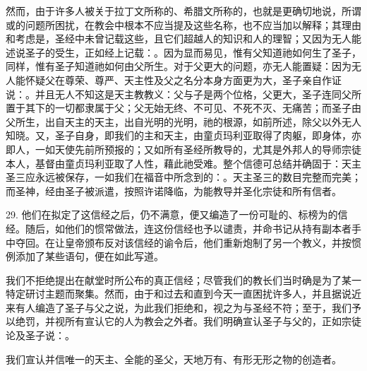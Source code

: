然而，由于许多人被关于拉丁文所称的、希腊文所称的，也就是更确切地说，所谓或的问题所困扰，在教会中根本不应当提及这些名称，也不应当加以解释；其理由和考虑是，圣经中未曾记载这些，且它们超越人的知识和人的理智；又因为无人能述说圣子的受生，正如经上记载：。因为显而易见，惟有父知道祂如何生了圣子，同样，惟有圣子知道祂如何由父所生。对于父更大的问题，亦无人能置疑：因为无人能怀疑父在尊荣、尊严、天主性及父之名分本身方面更为大，圣子亲自作证说：。并且无人不知这是天主教教义：父与子是两个位格，父更大，圣子连同父所置于其下的一切都隶属于父；父无始无终、不可见、不死不灭、无痛苦；而圣子由父所生，出自天主的天主，出自光明的光明，祂的根源，如前所述，除父以外无人知晓。又，圣子自身，即我们的主和天主，由童贞玛利亚取得了肉躯，即身体，亦即人，一如天使先前所预报的；又如所有圣经所教导的，尤其是外邦人的导师宗徒本人，基督由童贞玛利亚取了人性，藉此祂受难。整个信德可总结并确固于：天主圣三应永远被保存，一如我们在福音中所念到的：。天主圣三的数目完整而完美；而圣神，经由圣子被派遣，按照许诺降临，为能教导并圣化宗徒和所有信者。\par

29. 他们在拟定了这信经之后，仍不满意，便又编造了一份可耻的、标榜为的信经。随后，如他们的惯常做法，连这份信经也予以谴责，并命书记从持有副本者手中夺回。在让皇帝颁布反对该信经的谕令后，他们重新炮制了另一个教义，并按惯例添加了某些语句，便在如此写道。\par

我们不拒绝提出在献堂时所公布的真正信经；尽管我们的教长们当时确是为了某一特定研讨主题而聚集。然而，由于和过去和直到今天一直困扰许多人，并且据说近来有人编造了圣子与父之说，为此我们拒绝和，视之为与圣经不符；至于，我们予以绝罚，并视所有宣认它的人为教会之外者。我们明确宣认圣子与父的，正如宗徒论及圣子说：。\par

我们宣认并信唯一的天主、全能的圣父，天地万有、有形无形之物的创造者。\par

